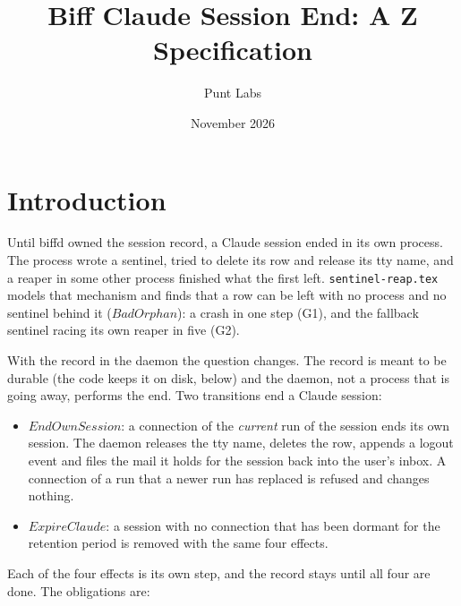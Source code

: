 \documentclass[a4paper,10pt,fleqn]{article}
\begin{document}
\title{Biff Claude Session End: A Z Specification}
\author{Punt Labs}
\date{November 2026}
\maketitle

\section{Introduction}

Until biffd owned the session record, a Claude session ended in its own process.
The process wrote a sentinel, tried to delete its row and release its tty name,
and a reaper in some other process finished what the first left.
\texttt{sentinel-reap.tex} models that mechanism and finds that a row can be left
with no process and no sentinel behind it ($BadOrphan$): a crash in one step (G1),
and the fallback sentinel racing its own reaper in five (G2).

With the record in the daemon the question changes.  The record is meant to be
durable (the code keeps it on disk, below) and
the daemon, not a process that is going away, performs the end.  Two transitions
end a Claude session:

\begin{itemize}
  \item $EndOwnSession$: a connection of the \emph{current} run of the session
    ends its own session.  The daemon releases the tty name, deletes the row,
    appends a logout event and files the mail it holds for the session back into
    the user's inbox.  A connection of a run that a newer run has replaced is
    refused and changes nothing.
  \item $ExpireClaude$: a session with no connection that has been dormant for the
    retention period is removed with the same four effects.
\end{itemize}

Each of the four effects is its own step, and the record stays until all four are
done.  The obligations are:
\end{document}
